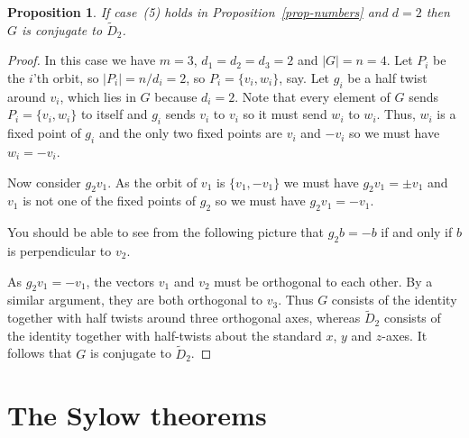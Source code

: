 \documentclass{amsart}
\newcommand{\tD}        {\widetilde{D}}
\newcommand{\blob}      {circle(0.03cm)}
\renewcommand{\:}{\colon}
\newtheorem{proposition}[theorem]{Proposition}
\theoremstyle{definition}
\begin{document}
\begin{proposition}\label{prop-class-dihedral-two}
 If case~(5) holds in Proposition~\ref{prop-numbers} and $d=2$ then
 $G$ is conjugate to $\tD_2$.
\end{proposition}
\begin{proof}
 In this case we have $m=3$, $d_1=d_2=d_3=2$ and $|G|=n=4$.  Let $P_i$
 be the $i$'th orbit, so $|P_i|=n/d_i=2$, so $P_i=\{v_i,w_i\}$, say.
 Let $g_i$ be a half twist around $v_i$, which lies in $G$ because
 $d_i=2$.  Note that every element of $G$ sends $P_i=\{v_i,w_i\}$ to
 itself and $g_i$ sends $v_i$ to $v_i$ so it must send $w_i$ to
 $w_i$.  Thus, $w_i$ is a fixed point of $g_i$ and the only two fixed
 points are $v_i$ and $-v_i$ so we must have $w_i=-v_i$.

 Now consider $g_2v_1$.  As the orbit of $v_1$ is $\{v_1,-v_1\}$ we
 must have $g_2v_1=\pm v_1$ and $v_1$ is not one of the fixed points
 of $g_2$ so we must have $g_2v_1=-v_1$.

 You should be able to see from the following picture that $g_2b=-b$
 if and only if $b$ is perpendicular to $v_2$.
 \begin{center}
 \end{center}
 As $g_2v_1=-v_1$, the vectors $v_1$ and $v_2$ must be orthogonal to
 each other.  By a similar argument, they are both orthogonal to
 $v_3$.  Thus $G$ consists of the identity together with half twists
 around three orthogonal axes, whereas $\tD_2$ consists of the
 identity together with half-twists about the standard $x$, $y$ and
 $z$-axes.  It follows that $G$ is conjugate to $\tD_2$.
\end{proof}

\section{The Sylow theorems}
\end{document}
